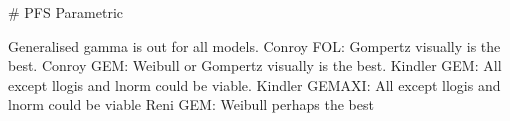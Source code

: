 # PFS Parametric

Generalised gamma is out for all models.
Conroy FOL: Gompertz visually is the best.
Conroy GEM: Weibull or Gompertz visually is the best.
Kindler GEM: All except llogis and lnorm could be viable.
Kindler GEMAXI: All except llogis and lnorm could be viable
Reni GEM: Weibull perhaps the best
